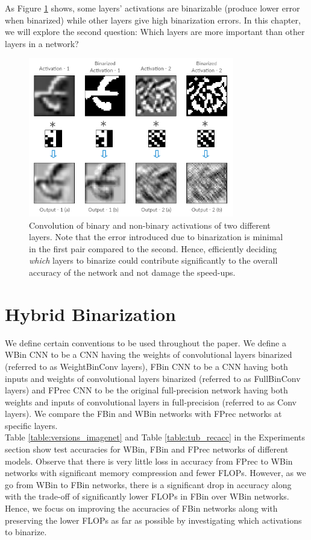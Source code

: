 \noindent As Figure \ref{fig:introdiag} shows, some layers' activations are binarizable (produce lower error when binarized) while other layers give high binarization errors. In this chapter, we will explore the second question: Which layers are more important than other layers in a network?

\begin{figure}[h]
\centering
\includegraphics[width=0.8\textwidth]{figures/Intro-Diagram.png}
\caption{Convolution of binary and non-binary activations of two different layers. Note that the error introduced due to binarization is minimal in the first pair compared to the second. Hence, efficiently deciding \textit{which} layers to binarize could contribute significantly to the overall accuracy of the network and not damage the speed-ups.}
\label{fig:introdiag}
\end{figure}

\section{Hybrid Binarization}

\noindent We define certain conventions to be used throughout the paper. We define a WBin CNN to be a CNN having the weights of convolutional layers binarized (referred to as WeightBinConv layers), FBin CNN to be a CNN having both inputs and weights of convolutional layers binarized (referred to as FullBinConv layers) and FPrec CNN to be the original full-precision network having both weights and inputs of convolutional layers in full-precision (referred to as Conv layers). We compare the FBin and WBin networks with FPrec networks at specific layers.\\

\noindent Table \ref{table:versions_imagenet} and Table \ref{table:tub_recacc} in the Experiments section show test accuracies for WBin, FBin and FPrec networks of different models. Observe that there is very little loss in accuracy from FPrec to WBin networks with significant memory compression and fewer FLOPs. However, as we go from WBin to FBin networks, there is a significant drop in accuracy along with the trade-off of significantly lower FLOPs in FBin over WBin networks. Hence, we focus on improving the accuracies of FBin networks along with preserving the lower FLOPs as far as possible by investigating which activations to binarize.


